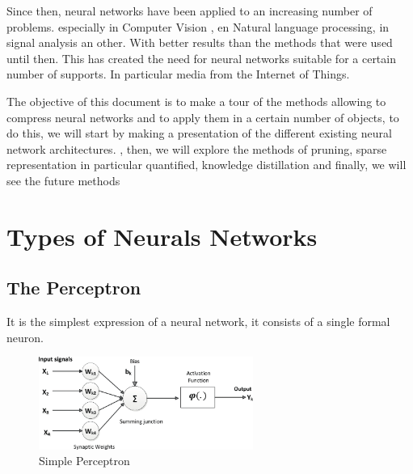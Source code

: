 \documentclass[twoside,twocolumn]{article}
\begin{document}
Since then, neural networks have been applied to an increasing number of problems. especially in Computer Vision\cite{MadhusmitaSahu}
\cite{Sornaminproceedings}, en Natural language processing\cite{jing2019survey}, in signal analysis\cite{MohamedIbn1}\cite{XiaofanLi1} 
an other. \cite{POZNYAK2019250} With better results than the methods that were used until then. This has created the need for neural 
networks suitable for a certain number of supports. In particular media from the Internet of Things.

The objective of this document is to make a tour of the methods allowing to compress neural networks and to apply them in a certain number 
of objects, to do this, we will start by making a presentation of the different existing neural network architectures. , then, we will 
explore the methods of pruning, sparse representation in particular quantified, knowledge distillation and finally, we will see the future methods


\section{Types of Neurals Networks}

\subsection{The Perceptron}

It is the simplest expression of a neural network, it consists of a single formal neuron\cite{warren1}.

\begin{figure}[h]
  \centering
  \includegraphics[width=70mm]{McCulloch-Pitts-computational-model-of-a-neuron.png}
  \caption{Simple Perceptron }
  \label{PerceptronMathematique}
\end{figure}
\end{document}
